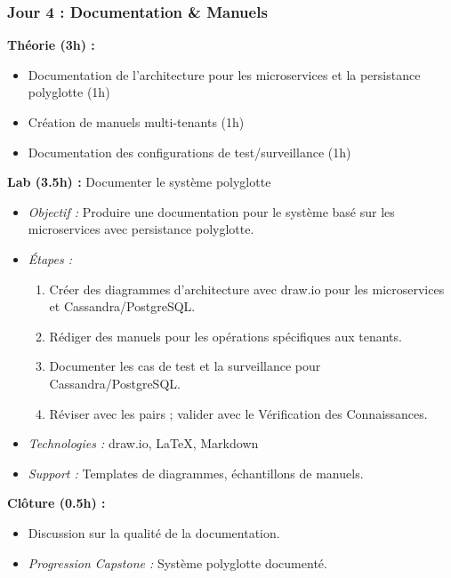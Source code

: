\documentclass[11pt]{article}
\begin{document}
\subsubsection{Jour 4 : Documentation \& Manuels}
\textbf{Théorie (3h) :}
\begin{itemize}
    \item Documentation de l'architecture pour les microservices et la persistance polyglotte (1h)
    \item Création de manuels multi-tenants (1h)
    \item Documentation des configurations de test/surveillance (1h)
\end{itemize}
\textbf{Lab (3.5h) :} Documenter le système polyglotte
\begin{itemize}
    \item \textit{Objectif :} Produire une documentation pour le système basé sur les microservices avec persistance polyglotte.
    \item \textit{Étapes :}
        \begin{enumerate}
            \item Créer des diagrammes d'architecture avec draw.io pour les microservices et Cassandra/PostgreSQL.
            \item Rédiger des manuels pour les opérations spécifiques aux tenants.
            \item Documenter les cas de test et la surveillance pour Cassandra/PostgreSQL.
            \item Réviser avec les pairs ; valider avec le Vérification des Connaissances.
        \end{enumerate}
    \item \textit{Technologies :} draw.io, LaTeX, Markdown
    \item \textit{Support :} Templates de diagrammes, échantillons de manuels.
\end{itemize}
\textbf{Clôture (0.5h) :}
\begin{itemize}
    \item Discussion sur la qualité de la documentation.
    \item \textit{Progression Capstone :} Système polyglotte documenté.
\end{itemize}
\end{document}
